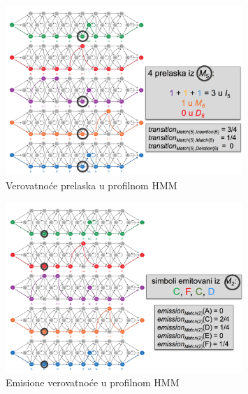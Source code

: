 \begin{figure}[H]
\centering
\includegraphics[width=0.8\textwidth]{poglavlja/10/slike/slika8.png}
\caption{Verovatnoće prelaska u profilnom HMM}
\label{slika: 8}
\end{figure}

\begin{figure}[H]
\centering
\includegraphics[width=0.8\textwidth]{poglavlja/10/slike/slika9.png}
\caption{Emisione verovatnoće u profilnom HMM}
\label{slika: 9}
\end{figure}

